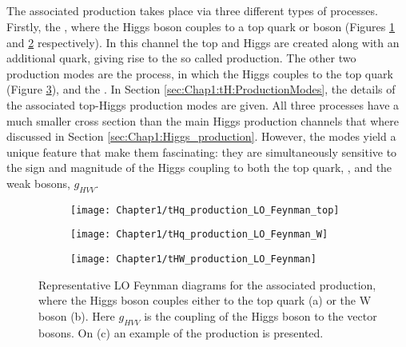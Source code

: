 \subsection{\tH}
\label{sec:Chap1:tHq}

The associated \tH production takes place via three different types of processes.
Firstly, the \tchannel, where the Higgs boson couples to a top quark or \PW boson 
(Figures \ref{fig:Chap1:tHq:Feynman_LO_top} and \ref{fig:Chap1:tHq:Feynman_LO_W} respectively).
In this channel the top and Higgs are created along with an additional quark, 
giving rise to the so called \tHq production. 
The other two production modes are the \tW process, in which the Higgs couples to the top quark (Figure \ref{fig:Chap1:tHW:Feynman_LO}), 
and the  \schannel. In Section \ref{sec:Chap1:tH:ProductionModes}, the details of the
associated top-Higgs production modes are given.
All three processes have a much smaller cross section than the main Higgs production channels that where
discussed in Section \ref{sec:Chap1:Higgs_production}. However, the \tH modes yield a unique feature
that make them fascinating: they are simultaneously sensitive to the sign and magnitude of the Higgs coupling to both
the top quark, \yt, and the weak bosons, $g_{HVV}$.

\begin{figure}
\centering
 \begin{subfigure}{.29\textwidth}
  \centering
  \texttt{[image: Chapter1/tHq\_production\_LO\_Feynman\_top]}
  \caption{}
  \label{fig:Chap1:tHq:Feynman_LO_top}
 \end{subfigure}%
 \begin{subfigure}{.29\textwidth}%
  \centering
  \texttt{[image: Chapter1/tHq\_production\_LO\_Feynman\_W]}
  \caption{}
  \label{fig:Chap1:tHq:Feynman_LO_W}
 \end{subfigure}%
 \begin{subfigure}{.29\textwidth}
  \centering
  \texttt{[image: Chapter1/tHW\_production\_LO\_Feynman]}
  \caption{}
  \label{fig:Chap1:tHW:Feynman_LO}
 \end{subfigure}%
    \caption{Representative LO Feynman diagrams for the \tchannel \tHq associated production, where 
    the Higgs boson couples either to the top quark (a) or the W boson (b). Here $g_{HVV}$ is the coupling 
    of the Higgs boson to the vector bosons. On (c) an example of the  \tWH production is presented.}
    \label{fig:Chap1:tHq:Feynman_LO}
\end{figure}




